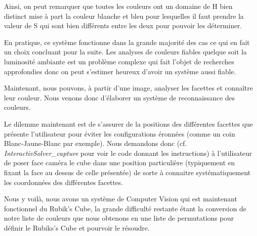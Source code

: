 Ainsi, on peut remarquer que toutes les couleurs ont un domaine de H bien distinct mise à part la couleur blanche et bleu pour lesquelles il faut prendre la valeur de S qui sont bien différents entre les deux pour pouvoir les déterminer.

En pratique, ce système fonctionne dans la grande majorité des cas ce qui en fait un choix concluant pour la suite. Les analyses de couleurs fiables quelque soit la luminosité ambiante est un problème complexe qui fait l'objet de recherches
approfondies donc on peut s'estimer heureux d'avoir un système aussi fiable.

Maintenant, nous pouvons, à partir d'une image, analyser les facettes et connaître leur couleur. Nous venons donc d'élaborer un système de reconnaissance des couleurs.

Le dilemme maintenant est de s'assurer de la positions des différentes facettes que présente l'utilisateur pour éviter les configurations éronnées (comme un coin Blanc-Jaune-Blanc par exemple).
Nous demandons donc (cf. \textit{InteractivSolver\_capture} pour voir le code donnant les instructions) à l'utilisateur de poser face caméra le cube dans une position particulière (typiquement en fixant la face au dessus de celle présentée) de sorte 
à connaitre systématiquement les coordonnées des différentes facettes.

Nous y voilà, nous avons un système de Computer Vision qui est maintenant fonctionnel du Rubik's Cube, la grande difficulté restante étant la conversion de notre liste de couleurs que nous obtenons en une liste de permutations pour définir le Rubiks's Cube
et pourvoir le résoudre.






